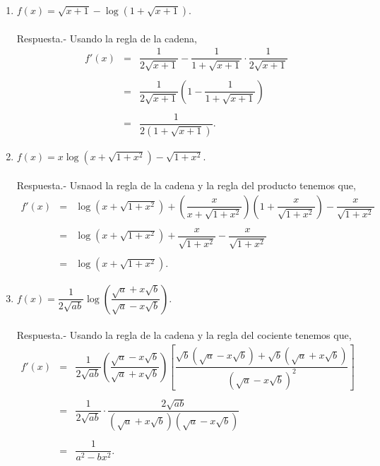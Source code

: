\begin{enumerate}[\bfseries 1.]
    \item $f(x)=\sqrt{x+1}-\log(1+\sqrt{x+1})$.\\\\
	Respuesta.-\; Usando la regla de la cadena,
	$$	
	\begin{array}{rcl}
	    f'(x) &=& \dfrac{1}{2\sqrt{x+1}}-\dfrac{1}{1+\sqrt{x+1}}\cdot \dfrac{1}{2\sqrt{x+1}}\\\\
		  &=& \dfrac{1}{2\sqrt{x+1}}\left(1-\dfrac{1}{1+\sqrt{x+1}}\right)\\\\
		  &=& \dfrac{1}{2\left(1+\sqrt{x+1}\right)}.
	\end{array}
	$$
	\vspace{.5cm}


    \item $f(x)=x\log\left(x+\sqrt{1+x^2}\right)-\sqrt{1+x^2}$.\\\\
	Respuesta.-\; Usnaod la regla de la cadena y la regla del producto tenemos que,
	$$
	\begin{array}{rcl}
	    f'(x) &=& \log\left(x+\sqrt{1+x^2}\right)+\left(\dfrac{x}{x+\sqrt{1+x^2}}\right)\left(1+\dfrac{x}{\sqrt{1+x^2}}\right)-\dfrac{x}{\sqrt{1+x^2}}\\\\
		  &=& \log\left(x+\sqrt{1+x^2}\right)+\dfrac{x}{\sqrt{1+x^2}}-\dfrac{x}{\sqrt{1+x^2}}\\\\
		  &=& \log\left(x+\sqrt{1+x^2}\right).
	\end{array}
	$$
	\vspace{.5cm}

    \item $f(x)=\dfrac{1}{2\sqrt{ab}}\log\left(\dfrac{\sqrt{a}+x\sqrt{b}}{\sqrt{a}-x\sqrt{b}}\right)$.\\\\
	Respuesta.-\; Usando la regla de la cadena y la regla del cociente tenemos que,
	$$
	\begin{array}{rcl}
	    f'(x) &=& \dfrac{1}{2\sqrt{ab}}\left(\dfrac{\sqrt{a}-x\sqrt{b}}{\sqrt{a}+x\sqrt{b}}\right)\left[\dfrac{\sqrt{b}\left(\sqrt{a}-x\sqrt{b}\right)+\sqrt{b}\left(\sqrt{a}+x\sqrt{b}\right)}{\left(\sqrt{a}-x\sqrt{b}\right)^2}\right]\\\\
		  &=& \dfrac{1}{2\sqrt{ab}}\cdot \dfrac{2\sqrt{ab}}{\left(\sqrt{a}+x\sqrt{b}\right)\left(\sqrt{a}-x\sqrt{b}\right)}\\\\
		  &=& \dfrac{1}{a^2-bx^2}.
	\end{array}
	$$
	\vspace{.5cm}


\end{enumerate}
